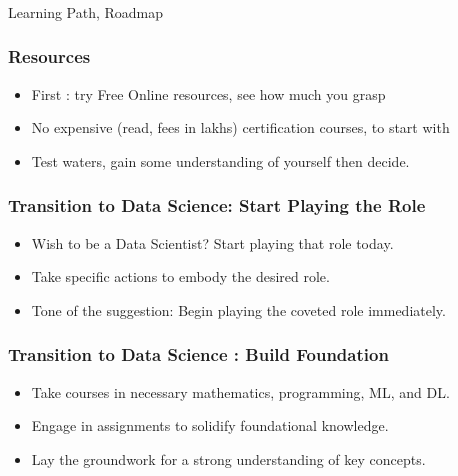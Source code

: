 \begin{frame}[fragile]\frametitle{}
	
	\begin{center}
	{\Large Learning Path, Roadmap}  
	\end{center}

\end{frame}


\begin{frame}[fragile]\frametitle{Resources}

      \begin{itemize}
			\item First : try Free Online resources, see how much you grasp
			\item No expensive (read, fees in lakhs) certification courses, to start with
			\item Test waters, gain some understanding of yourself then decide.
			\end{itemize}
			
\end{frame}

\begin{frame}[fragile]\frametitle{Transition to Data Science: Start Playing the Role}


        \begin{itemize}
            \item Wish to be a Data Scientist? Start playing that role today.
            \item Take specific actions to embody the desired role.
            \item Tone of the suggestion: Begin playing the coveted role immediately.
        \end{itemize}
			
\end{frame}

\begin{frame}[fragile]\frametitle{Transition to Data Science : Build Foundation}


        \begin{itemize}
            \item Take courses in necessary mathematics, programming, ML, and DL.
            \item Engage in assignments to solidify foundational knowledge.
            \item Lay the groundwork for a strong understanding of key concepts.
        \end{itemize}
			
\end{frame}

